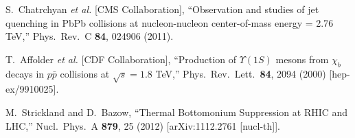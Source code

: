 \documentclass[12pt,a4paper,final]{iopart} %
\begin{document}
\begin{thebibliography}{100}


  

  

  S.~Chatrchyan {\it et al.}  [CMS Collaboration],
  ``Observation and studies of jet quenching in PbPb collisions at nucleon-nucleon center-of-mass energy = 2.76 TeV,''
  Phys.\ Rev.\ C {\bf 84}, 024906 (2011).


  T.~Affolder {\it et al.} [CDF Collaboration],
  ``Production of $\Upsilon(1S)$ mesons from $\chi_b$ decays in $p\bar{p}$ collisions at $\sqrt{s} = 1.8$ TeV,''
  Phys.\ Rev.\ Lett.\  {\bf 84}, 2094 (2000)
  [hep-ex/9910025].
  
  M.~Strickland and D.~Bazow,
  ``Thermal Bottomonium Suppression at RHIC and LHC,''
  Nucl.\ Phys.\ A {\bf 879}, 25 (2012)
  [arXiv:1112.2761 [nucl-th]].
  






\end{thebibliography}
\end{document}
